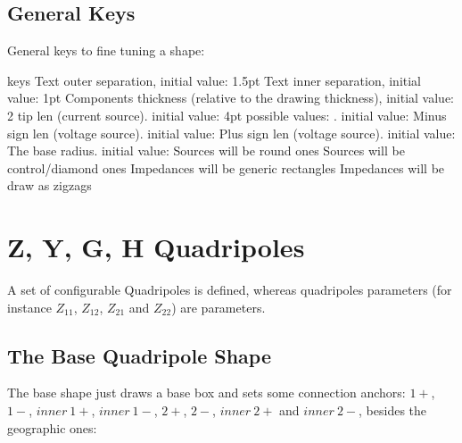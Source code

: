 \documentclass[10pt]{article}
\begin{document}
\subsection{General Keys}\label{generalkeys}
General keys to fine tuning a shape:
\begin{describelist*}[30mm]{keys}
    {Text outer separation, initial value: 1.5pt}
    {Text inner separation, initial value: 1pt}
   {Components thickness (relative to the drawing thickness), initial value: 2}
   {tip len (current source). initial value: 4pt}
   {possible values: . initial value: }
    {Minus sign len (voltage source). initial value: }
    {Plus sign len (voltage source). initial value: }
   {The base radius. initial value: }
   {Sources will be round ones}
   {Sources will be control/diamond ones}
   {Impedances will be generic rectangles}
   {Impedances will be draw as zigzags}
\end{describelist*}




\section{Z, Y, G, H Quadripoles}\label{quadanchors}
A set of configurable Quadripoles is defined, whereas quadripoles parameters (for instance $Z_{11}$, $Z_{12}$, $Z_{21}$ and $Z_{22}$) are  parameters.
\subsection{The Base Quadripole Shape}
The base shape just draws a base box and sets some connection anchors: $1+$, $1-$, $inner\ 1+$, $inner\ 1-$, $2+$, $2-$, $inner\ 2+$ and $inner\ 2-$, besides the geographic ones:


\begin{center}%
\end{center}
\end{document}
